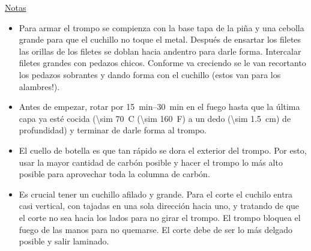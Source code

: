 \underline{Notas}
\begin{itemize}
\item Para armar el trompo se compienza con la base tapa de la piña y una cebolla grande para que el cuchillo no toque el metal.  Después de ensartar los filetes las orillas de los filetes se doblan hacia andentro para darle forma. Intercalar filetes grandes con pedazos chicos. Conforme va creciendo se le van recortanto los pedazos sobrantes y dando forma con el cuchillo (estos van para los alambres!). 
\item Antes de empezar, rotar por \SIrange{15}{30}{min} en el fuego hasta que la última capa ya esté cocida (\SI{\sim 70}{C} (\SI{\sim 160}{F}) a un dedo (\SI{\sim 1.5}{cm}) de profundidad) y terminar de darle forma al trompo.
\item El cuello de botella es que tan rápido se dora el exterior del trompo. Por esto, usar la mayor cantidad de carbón posible y hacer el trompo lo más alto posible para aprovechar toda la columna de carbón.
\item Es crucial tener un cuchillo afilado y grande. Para el corte el cuchilo entra casi vertical, con tajadas en una sola dirección hacia uno, y tratando de que el corte no sea hacia los lados para no girar el trompo. El trompo bloquea el fuego de las manos para no quemarse. El corte debe de ser lo más delgado posible y salir laminado.
\end{itemize}
